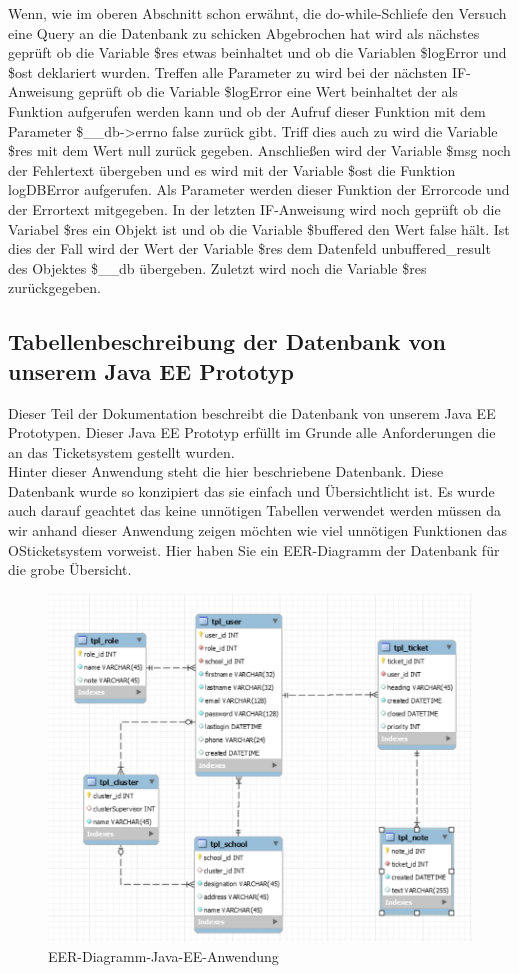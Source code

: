 Wenn, wie im oberen Abschnitt schon erwähnt, die do-while-Schliefe den Versuch eine Query an die Datenbank zu schicken Abgebrochen hat wird als nächstes geprüft ob die Variable \$res etwas beinhaltet und ob die Variablen \$logError und \$ost deklariert wurden. Treffen alle Parameter zu wird bei der nächsten IF-Anweisung geprüft ob die Variable \$logError eine Wert beinhaltet der als Funktion aufgerufen werden kann und ob der Aufruf dieser Funktion mit dem Parameter \$\_\_db->errno false zurück gibt.
Triff dies auch zu wird die Variable \$res mit dem Wert null zurück gegeben. Anschließen wird der Variable \$msg noch der Fehlertext übergeben und es wird mit der Variable \$ost  die Funktion logDBError aufgerufen. Als Parameter werden dieser Funktion der Errorcode und der Errortext mitgegeben.
In der letzten IF-Anweisung wird noch geprüft ob die Variabel \$res ein Objekt ist und ob die Variable \$buffered den Wert false hält. Ist dies der Fall wird der Wert der Variable \$res dem Datenfeld unbuffered\_result des Objektes \$\_\_db übergeben. 
Zuletzt wird noch die Variable \$res zurückgegeben.
\newpage

\subsection{Tabellenbeschreibung der Datenbank von unserem Java EE Prototyp}
Dieser Teil der Dokumentation beschreibt die Datenbank von unserem Java EE Prototypen. Dieser Java EE Prototyp erfüllt im Grunde alle Anforderungen die an das Ticketsystem gestellt wurden.\\
Hinter dieser Anwendung steht die hier beschriebene Datenbank. Diese Datenbank wurde so konzipiert das sie einfach und Übersichtlicht ist. Es wurde auch darauf geachtet das keine unnötigen Tabellen verwendet werden müssen da wir anhand dieser Anwendung zeigen möchten wie viel unnötigen Funktionen das OSticketsystem vorweist.
Hier haben Sie ein EER-Diagramm der Datenbank für die grobe Übersicht.
\begin{figure}[h]
	\centering
	\includegraphics[scale=.8]{figures/EER-Diagramm-Java-EE-Anwendung.PNG}
	\caption{EER-Diagramm-Java-EE-Anwendung}
	\label{EER-Diagramm-Java-EE-Anwendung}
\end{figure}

